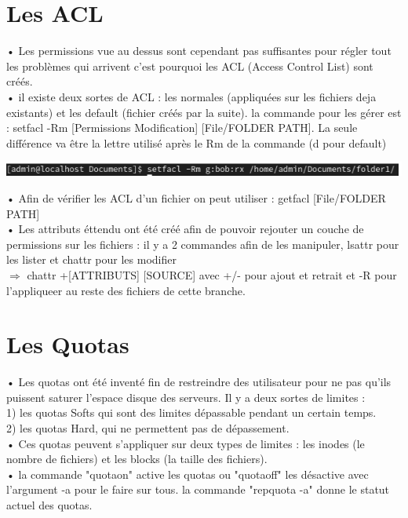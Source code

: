 \documentclass[a4paper, 11pt, french, oneside]{book}
\begin{document}
		\section{Les ACL} 
			• Les permissions vue au dessus sont cependant pas suffisantes pour régler tout les problèmes qui arrivent c'est pourquoi les ACL (Access Control List) sont créés. \\
			• il existe deux sortes de ACL : les normales (appliquées sur les fichiers deja existants) et les default (fichier créés par la suite). la commande pour les gérer est : setfacl -Rm [Permissions Modification] [File/FOLDER PATH]. La seule différence va être la lettre utilisé après le Rm de la commande  (d pour default)  \\
			\begin{flushleft}
				\includegraphics[scale=1]{ACL.png}
			\end{flushleft}
		    • Afin de vérifier les ACL d'un fichier on peut utiliser : getfacl [File/FOLDER PATH]\\
			• Les attributs éttendu ont été créé afin de pouvoir rejouter un couche de permissions sur les fichiers : il y a 2 commandes afin de les manipuler, lsattr pour les lister et chattr pour les modifier\\
		 	$\Rightarrow$ chattr +[ATTRIBUTS] [SOURCE] avec +/- pour ajout et retrait et -R pour l'appliqueer au reste des fichiers de cette branche.\\
		\section{Les Quotas}
			• Les quotas ont été inventé fin de restreindre des utilisateur pour ne pas qu'ils puissent saturer l'espace disque des serveurs. Il y a deux sortes de limites :   \\
			1) les quotas Softs qui sont des limites dépassable pendant un certain temps. \\
		 	2) les quotas Hard, qui ne permettent pas de dépassement. \\
			• Ces quotas peuvent s'appliquer sur deux types de limites : les inodes (le nombre de fichiers) et les blocks (la taille des fichiers).\\
			• la commande "quotaon" active les quotas ou "quotaoff" les désactive avec l'argument -a pour le faire sur tous. la commande "repquota -a" donne le statut actuel des quotas.\\
\end{document}
